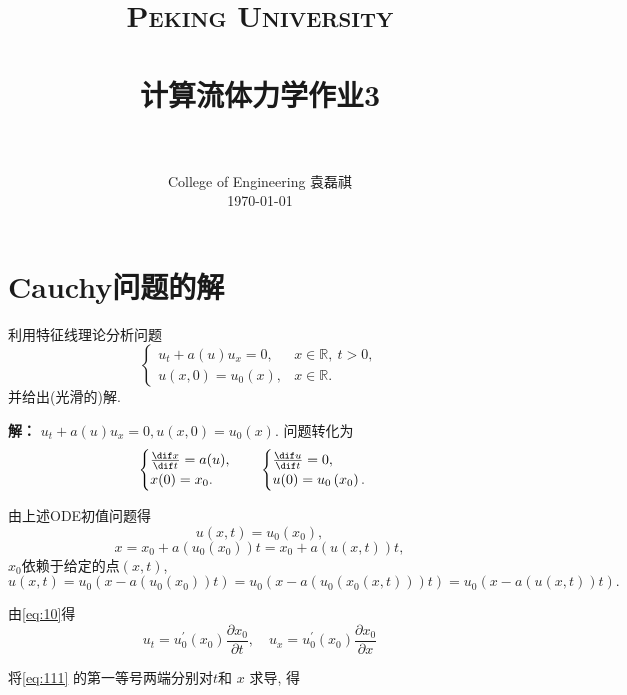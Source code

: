 \documentclass[12pt]{article}
\title{
		\vspace{-1in} 	
		\usefont{OT1}{bch}{b}{n}
		\normalfont \normalsize \textsc{\LARGE Peking University}\\[0.2cm] %
		\horrule{0.5pt} \\[0.2cm]
		\huge \bfseries{计算流体力学作业3} \\[-0.2cm]
		\horrule{2pt} \\[0.2cm]
}
\author{
		\normalfont 								\normalsize
		College of Engineering \quad 2001111690  \quad 袁磊祺\\	\normalsize
        \today
}
\date{}
\begin{document}


\maketitle

\section{Cauchy问题的解}

利用特征线理论分析问题
\begin{equation}
	\begin{cases}
		u_{t}+a(u) u_{x}=0, & x \in \mathbb{R},\ t>0, \\
		u(x, 0)=u_{0}(x), & x \in \mathbb{R}.
	\end{cases}
	\label{eq:10}
\end{equation}
并给出(光滑的)解.

{\bfseries 解：}
$u_{t}+a(u) u_{x}=0, u(x, 0)=u_{0}(x) .$ 问题转化为
\begin{equation}
	\begin{cases}
		\frac{\dif x}{\dif t}=a(u), \\
		x(0)=x_{0}.
	\end{cases}
	\quad
	\begin{cases}
		\frac{\dif u}{\dif t}=0, \\
		u(0)=u_{0}\left(x_{0}\right).		
	\end{cases}
\end{equation}

由上述ODE初值问题得
\begin{equation}
	u(x,t) = u_0(x_0),
	\label{eq:11}
\end{equation}
\begin{equation}
	x=x_{0}+a(u_0(x_0))t=x_{0}+a(u(x,t))t,
	\label{eq:111}
\end{equation}
$x_0$依赖于给定的点$(x,t)$,
\begin{equation}
	u(x, t)=u_{0}\left(x-a(u_0(x_0))t\right)=u_{0}\left(x-a(u_0(x_0(x,t)))t\right)=u_{0}\left(x-a(u(x,t))t\right).
	\label{eq:12}
\end{equation}

由\cref{eq:10}得
\begin{equation}
	u_{t}=u_{0}^{\prime}\left(x_{0}\right) \frac{\partial x_{0}}{\partial t}, \quad u_{x}=u_{0}^{\prime}\left(x_{0}\right) \frac{\partial x_{0}}{\partial x}
	\label{eq:121}
\end{equation}

将\cref{eq:111} 的第一等号两端分别对$t$和 $x$ 求导, 得
\end{document}
